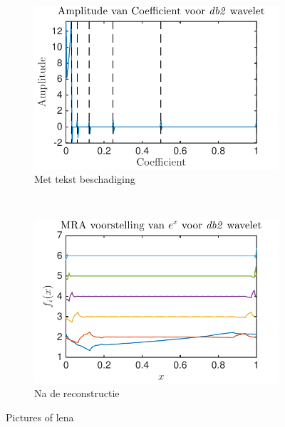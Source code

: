\begin{figure}
\begin{subfigure}[b]{0.45\textwidth}
        \includegraphics[width=\textwidth]{../src/denoising/db2_noNoise/coef_exp_db2_5}
        \caption{Met tekst beschadiging}
        \label{fig:tiger}
    \end{subfigure}
    ~ %
    \begin{subfigure}[b]{0.45\textwidth}
        \includegraphics[width=\textwidth]{../src/denoising/db2_noNoise/MRA_exp_db2_5}
        \caption{Na de reconstructie}
        \label{fig:mouse}
    \end{subfigure}

    \caption{Pictures of lena}\label{fig:animals}
\end{figure}

